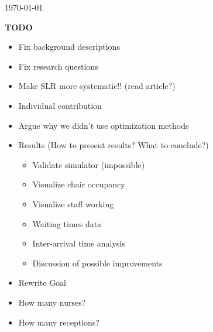 \documentclass[a4paper,12pt]{article}
\begin{document}
\begin{titlepage}
		
		
		
		\vfill\vfill\vfill %
		
		{\large\today} %
		
		
		\vfill\vfill

		
		\vfill %
		
	\end{titlepage}
	\pagebreak

\thispagestyle{empty}
\newpage
\tableofcontents
\newpage
\setcounter{page}{1}

\textbf{TODO}

\begin{itemize}
    \item {} Fix background descriptions
    \item {} Fix research questions
    \item {} Make SLR more systematic!! (read article?)
    \item {} Individual contribution
    \item {} Argue why we didn't use optimization methods
    \item {} Results (How to present results? What to conclude?)
    \begin{itemize}
        \item {} Validate simulator (impossible)
        \item {} Visualize chair occupancy
        \item {} Visualize staff working
        \item {} Waiting times data
        \item {} Inter-arrival time analysis
        \item {} Discussion of possible improvements
    \end{itemize}
    \item {} Rewrite Goal
    \item {} How many nurses?
    \item {} How many receptions?
\end{itemize}
\end{document}
